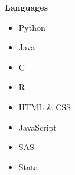 \documentclass[a4paper,12pt]{article}
\begin{document}
{\begin{center}
\textbf{Languages} \\
\end{center}
\begin{multicols}{4}
\begin{itemize}
  \item Python
  \item Java
  \item C
  \item R
  \item HTML \& CSS
  \item JavaScript
  \item SAS
  \item Stata
\end{itemize}
\end{multicols}


}
\end{document}
